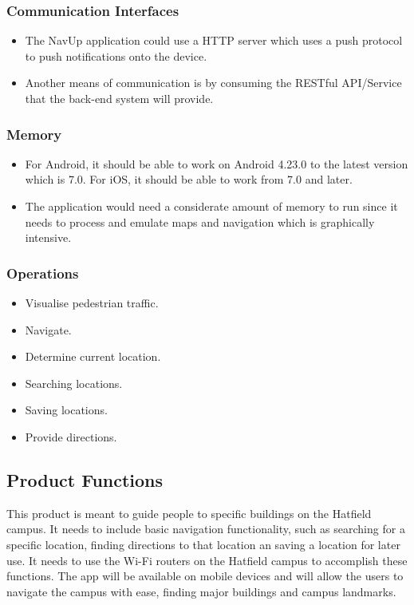 \documentclass[runningheads,a4paper]{article}
\begin{document}
\subsubsection{Communication Interfaces}
\begin{itemize}
	\item 	The NavUp application could use a HTTP server which uses a push protocol to push notifications onto the device.
	\item  Another means of communication is by consuming the RESTful API/Service that the back-end system will provide.
\end{itemize}
\subsubsection{Memory}
\begin{itemize}
	\item For Android, it should be able to work on Android 4.23.0 to the latest version which is 7.0. For iOS, it should be able to work from 7.0 and later.
	\item The application would need a considerate amount of memory to run since it needs to process and emulate maps and navigation which is graphically intensive.
	
\end{itemize}
\subsubsection{Operations}
\begin{itemize}
	\item Visualise pedestrian traffic.
	\item Navigate.
	\item Determine current location.
	\item Searching locations.
	\item Saving locations.
	\item Provide directions.
	
\end{itemize}

\subsection{Product Functions}

This product is meant to guide people to specific buildings on the Hatfield campus. It needs to include basic navigation functionality, such as searching for a specific location, finding directions to that location an saving a location for later use. It needs to use the Wi-Fi routers on the Hatfield campus to accomplish these functions.
The app will be available on mobile devices and will allow the users to navigate the campus with ease, finding major buildings and campus landmarks.
\end{document}
